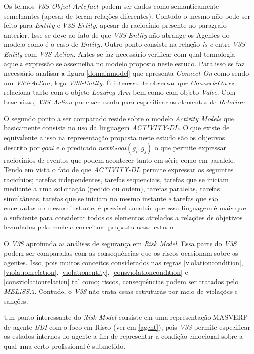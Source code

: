 Os termos \textit{V3S-Object} $Artefact$ podem ser dados como semanticamente semelhantes (apesar de terem relações diferentes). Contudo o mesmo não pode ser feito para $Entity$ e \textit{V3S-Entity}, apesar do raciocínio presente no paragrafo anterior. Isso se deve ao fato de que \textit{V3S-Entity} não abrange os Agentes do modelo como é o caso de $Entity$. Outro ponto consiste na relação \textit{is a} entre \textit{V3S-Entity} com \textit{V3S-Action}. Antes se faz necessário verificar com qual termologia aquela expressão se assemelha no modelo proposto neste estudo. Para isso se faz necessário analisar a figura \ref{domainmodel} que apresenta \textit{Connect-On} como sendo um \textit{V3S-Action}, logo \textit{V3S-Entity}. É interessante observar que \textit{Connect-On} se relaciona tanto com o objeto \textit{Loading-Arm} bem como com objeto \textit{Valve}. Com base nisso, \textit{V3S-Action} pode ser usado para especificar os elementos de $Relation$. 

O segundo ponto a ser comparado reside sobre o modelo \textit{Activity Models} que basicamente consiste no uso da linguagem \textit{ACTIVITY-DL}. O que existe de equivalente a isso na representação proposta neste estudo são os objetivos descrito por $goal$ e o predicado $nextGoal(g_i,g_j)$ o que permite expressar raciocínios de eventos que podem acontecer tanto em série como em paralelo. Tendo em vista o fato de que \textit{ACTIVITY-DL} permite expressar os seguintes racicínios; tarefas independentes, tarefas sequenciais, tarefas que se iniciam mediante a uma solicitação (pedido ou ordem), tarefas paralelas, tarefas  simultâneas, tarefas que se iniciam no mesmo instante e tarefas que são encerradas no mesmo instante, é possível concluir que essa linguagem é mais que o suficiente para considerar todos os elementos atrelados a relações de objetivos levantados pelo modelo conceitual proposto nesse estudo.  

O \textit{V3S} aprofunda as análises de segurança em \textit{Risk Model}. Essa parte do \textit{V3S} podem ser comparadas com as consequências que os riscos ocasionam sobre os agentes. Isso, pois muitos conceitos considerados nas regras \ref{violationcondition}, \ref{violationrelation}, \ref{violationentity}, \ref{consviolationcondition} e \ref{consviolationrelation} tal como; riscos, consequências podem ser tratados pelo \textit{MELISSA}. Contudo, o \textit{V3S} não trata essas estruturas por meio de violações e sanções. 

Um ponto interessante do \textit{Risk Model} consiste em uma representação MASVERP  de agente \textit{BDI} com o foco em Risco (ver em \ref{agent}), pois \textit{V3S} permite especificar os estados internos do agente a fim de representar a condição emocional sobre a qual uma certo profissional é submetido. 
